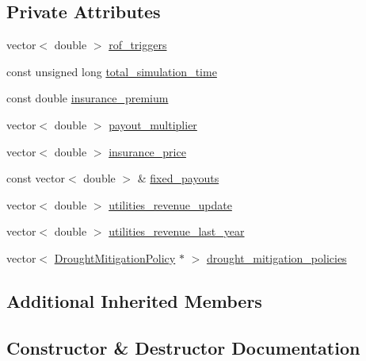 \subsection*{Private Attributes}
\begin{DoxyCompactItemize}
\item 
vector$<$ double $>$ \mbox{\hyperlink{classInsuranceStorageToROF_afcc3f791ff54cb25a0f9c4381be4650e_afcc3f791ff54cb25a0f9c4381be4650e}{rof\+\_\+triggers}}
\item 
const unsigned long \mbox{\hyperlink{classInsuranceStorageToROF_accb3ce9db21061862e03f927cc6effbe_accb3ce9db21061862e03f927cc6effbe}{total\+\_\+simulation\+\_\+time}}
\item 
const double \mbox{\hyperlink{classInsuranceStorageToROF_ab73e7f3e679a16b60878495566a668da_ab73e7f3e679a16b60878495566a668da}{insurance\+\_\+premium}}
\item 
vector$<$ double $>$ \mbox{\hyperlink{classInsuranceStorageToROF_a69beb8a95cf8f78845b5cd9c6f4a12ca_a69beb8a95cf8f78845b5cd9c6f4a12ca}{payout\+\_\+multiplier}}
\item 
vector$<$ double $>$ \mbox{\hyperlink{classInsuranceStorageToROF_a5c2b3740b69b34fa2baa0a2df914d8a8_a5c2b3740b69b34fa2baa0a2df914d8a8}{insurance\+\_\+price}}
\item 
const vector$<$ double $>$ \& \mbox{\hyperlink{classInsuranceStorageToROF_af58d0341b58f3039aca3c3cd22c7c2f1_af58d0341b58f3039aca3c3cd22c7c2f1}{fixed\+\_\+payouts}}
\item 
vector$<$ double $>$ \mbox{\hyperlink{classInsuranceStorageToROF_a7fe48af9dd2f9ce199bbfd422240cf87_a7fe48af9dd2f9ce199bbfd422240cf87}{utilities\+\_\+revenue\+\_\+update}}
\item 
vector$<$ double $>$ \mbox{\hyperlink{classInsuranceStorageToROF_a1c2f8acdda360ac7ca4d550f6efa1497_a1c2f8acdda360ac7ca4d550f6efa1497}{utilities\+\_\+revenue\+\_\+last\+\_\+year}}
\item 
vector$<$ \mbox{\hyperlink{classDroughtMitigationPolicy}{Drought\+Mitigation\+Policy}} $\ast$ $>$ \mbox{\hyperlink{classInsuranceStorageToROF_a78ebe72a40c8023dd79c91d36f5e1596_a78ebe72a40c8023dd79c91d36f5e1596}{drought\+\_\+mitigation\+\_\+policies}}
\end{DoxyCompactItemize}
\subsection*{Additional Inherited Members}


\subsection{Constructor \& Destructor Documentation}
\mbox{\label{classInsuranceStorageToROF_a7769ebf2a6c73fa0efc55268712e8157_a7769ebf2a6c73fa0efc55268712e8157}} 
